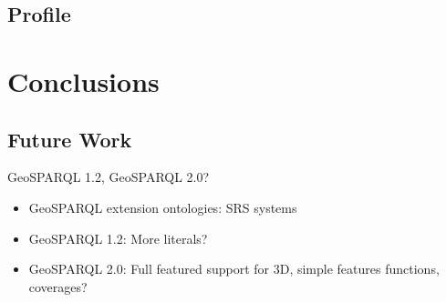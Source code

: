 \documentclass[runningheads]{llncs}
\begin{document}
\subsection{Profile}\label{sec:profile}


\section{Conclusions}\label{sec:conclusions}

\subsection{Future Work}\label{sec:futurework}
GeoSPARQL 1.2, GeoSPARQL 2.0?
\begin{itemize}
    \item GeoSPARQL extension ontologies: SRS systems
    \item GeoSPARQL 1.2: More literals?
    \item GeoSPARQL 2.0: Full featured support for 3D, simple features functions, coverages?
\end{itemize}


%
%
%


%




\end{document}
